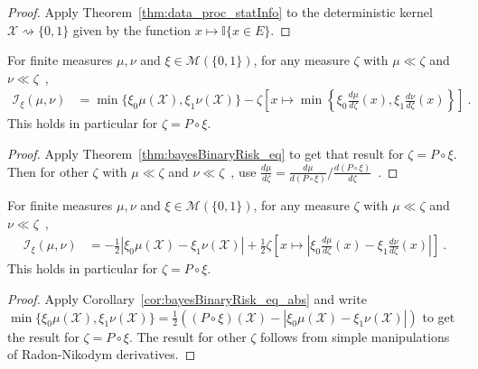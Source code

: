 \begin{proof}\leanok
{}
Apply Theorem~\ref{thm:data_proc_statInfo} to the deterministic kernel $\mathcal X \rightsquigarrow \{0,1\}$ given by the function $x \mapsto \mathbb{I}\{x \in E\}$.
\end{proof}


\begin{lemma}
  \label{lem:statInfo_eq_sub_min}
  \leanok
  For finite measures $\mu, \nu$ and $\xi \in \mathcal M(\{0,1\})$, for any measure $\zeta$ with $\mu \ll \zeta$ and $\nu \ll \zeta$~,
  \begin{align*}
  \mathcal I_\xi(\mu, \nu)
  &= \min\{\xi_0\mu(\mathcal X), \xi_1\nu(\mathcal X)\} - \zeta\left[x \mapsto \min \left\{\xi_0\frac{d \mu}{d\zeta}(x), \xi_1\frac{d \nu}{d\zeta}(x)\right\}\right]
  \: .
  \end{align*}
  This holds in particular for $\zeta = P \circ \xi$.
\end{lemma}

\begin{proof}\leanok
{}
Apply Theorem~\ref{thm:bayesBinaryRisk_eq} to get that result for $\zeta = P \circ \xi$. Then for other $\zeta$ with $\mu \ll \zeta$ and $\nu \ll \zeta$~, use $\frac{d \mu}{d\zeta} = \frac{d \mu}{d(P \circ \xi)} / \frac{d (P \circ \xi)}{d\zeta}$~.
\end{proof}


\begin{lemma}
  \label{lem:statInfo_eq_integral_abs_sub}
  \leanok
  For finite measures $\mu, \nu$ and $\xi \in \mathcal M(\{0,1\})$, for any measure $\zeta$ with $\mu \ll \zeta$ and $\nu \ll \zeta$~,
  \begin{align*}
  \mathcal I_\xi(\mu, \nu)
  &= - \frac{1}{2} \left\vert \xi_0\mu(\mathcal X) - \xi_1\nu(\mathcal X) \right\vert + 
  \frac{1}{2} \zeta\left[x \mapsto \left\vert \xi_0\frac{d \mu}{d\zeta}(x) - \xi_1\frac{d \nu}{d\zeta}(x)\right\vert\right] 
  \: .
  \end{align*}
  This holds in particular for $\zeta = P \circ \xi$.
\end{lemma}

\begin{proof}%
{}
Apply Corollary~\ref{cor:bayesBinaryRisk_eq_abs} and write $\min\{\xi_0\mu(\mathcal X), \xi_1\nu(\mathcal X)\} = \frac{1}{2}\left((P \circ \xi)(\mathcal X) - \left\vert \xi_0\mu(\mathcal X) - \xi_1\nu(\mathcal X) \right\vert \right)$ to get the result for $\zeta = P \circ \xi$.
The result for other $\zeta$ follows from simple manipulations of Radon-Nikodym derivatives.
\end{proof}


